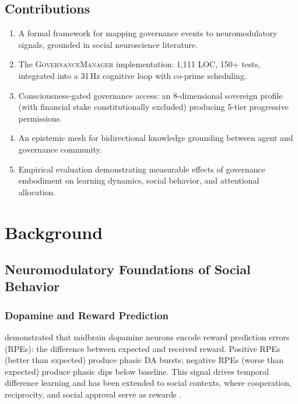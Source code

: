\documentclass[11pt,a4paper]{article}
\begin{document}
\subsection{Contributions}

\begin{enumerate}
  \item A formal framework for mapping governance events to neuromodulatory signals, grounded in social neuroscience literature.
  \item The \textsc{GovernanceManager} implementation: 1,111 LOC, 150+ tests, integrated into a 31\,Hz cognitive loop with co-prime scheduling.
  \item Consciousness-gated governance access: an 8-dimensional sovereign profile (with financial stake constitutionally excluded) producing 5-tier progressive permissions.
  \item An epistemic mesh for bidirectional knowledge grounding between agent and governance community.
  \item Empirical evaluation demonstrating measurable effects of governance embodiment on learning dynamics, social behavior, and attentional allocation.
\end{enumerate}

\section{Background}
\label{sec:background}

\subsection{Neuromodulatory Foundations of Social Behavior}

\subsubsection{Dopamine and Reward Prediction}

\citet{schultz1997neural} demonstrated that midbrain dopamine neurons encode reward prediction errors (RPEs): the difference between expected and received reward.
Positive RPEs (better than expected) produce phasic DA bursts; negative RPEs (worse than expected) produce phasic dips below baseline.
This signal drives temporal difference learning \citep{sutton1998introduction} and has been extended to social contexts, where cooperation, reciprocity, and social approval serve as rewards \citep{behrens2009computation, ruff2014neurobiology}.
\end{document}
